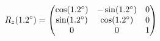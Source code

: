 \documentclass[preview]{standalone}
\begin{document}
\begin{align*}
\special{dvisvgm:raw <g id='unique000'>}R_z(1.2^\circ) = \begin{pmatrix} \cos(1.2^\circ) & -\sin(1.2^\circ) & 0 \\ \sin(1.2^\circ) & \cos(1.2^\circ) & 0 \\ 0 & 0 & 1 \end{pmatrix}\special{dvisvgm:raw </g>}
\end{align*}
\end{document}
